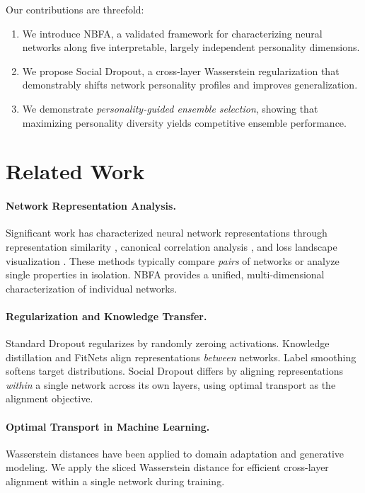 \documentclass[letterpaper]{article}
\begin{document}
Our contributions are threefold:
\begin{enumerate}
    \item We introduce NBFA, a validated framework for characterizing neural networks along five interpretable, largely independent personality dimensions.
    \item We propose Social Dropout, a cross-layer Wasserstein regularization that demonstrably shifts network personality profiles and improves generalization.
    \item We demonstrate \emph{personality-guided ensemble selection}, showing that maximizing personality diversity yields competitive ensemble performance.
\end{enumerate}

\section{Related Work}
\label{sec:related}

\paragraph{Network Representation Analysis.}
Significant work has characterized neural network representations through representation similarity \citep{kornblith2019similarity}, canonical correlation analysis \citep{raghu2017svcca, morcos2018insights}, and loss landscape visualization \citep{li2018visualizing}. These methods typically compare \emph{pairs} of networks or analyze single properties in isolation. NBFA provides a unified, multi-dimensional characterization of individual networks.

\paragraph{Regularization and Knowledge Transfer.}
Standard Dropout \citep{srivastava2014dropout} regularizes by randomly zeroing activations. Knowledge distillation \citep{hinton2015distilling} and FitNets \citep{romero2015fitnets} align representations \emph{between} networks. Label smoothing \citep{szegedy2016rethinking} softens target distributions. Social Dropout differs by aligning representations \emph{within} a single network across its own layers, using optimal transport as the alignment objective.

\paragraph{Optimal Transport in Machine Learning.}
Wasserstein distances have been applied to domain adaptation \citep{sun2016deep, cuturi2013sinkhorn} and generative modeling. We apply the sliced Wasserstein distance \citep{bonneel2015sliced} for efficient cross-layer alignment within a single network during training.
\end{document}
